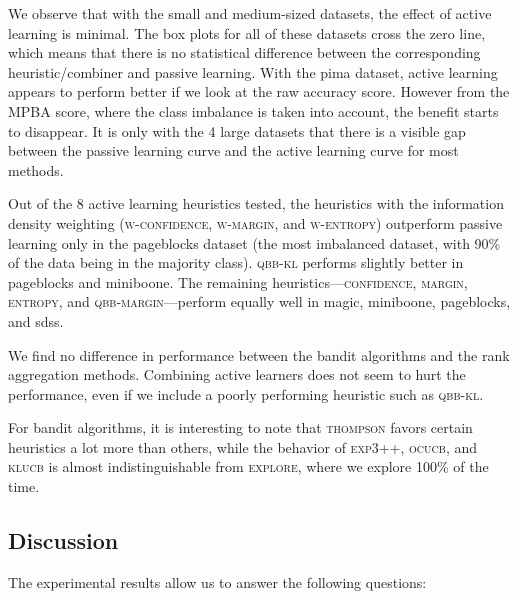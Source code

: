 \documentclass[fleqn,10pt,lineno]{wlpeerj} %
\begin{document}
We observe that with the small and medium-sized datasets, the effect of active
learning is minimal. The box plots for all of these datasets cross the zero
line, which means that there is no statistical difference between the
corresponding heuristic/combiner and passive learning. With the pima dataset,
active learning appears to perform better if we look at the raw accuracy score.
However from the MPBA score, where the class imbalance is taken into account,
the benefit starts to disappear. It is only with the 4 large datasets that
there is a visible gap between the passive learning curve and the active
learning curve for most methods.

Out of the 8 active learning heuristics tested, the heuristics with the
information density weighting (\textsc{w-confidence},
\textsc{w-margin}, and \textsc{w-entropy}) outperform passive learning only in
the pageblocks dataset (the most imbalanced dataset, with 90\% of the data
being in the majority class). \textsc{qbb-kl} performs slightly better in
pageblocks and miniboone. The remaining heuristics---\textsc{confidence},
\textsc{margin}, \textsc{entropy}, and \textsc{qbb-margin}---perform equally
well in magic, miniboone, pageblocks, and sdss.

We find no difference in performance between the bandit algorithms and
the rank aggregation methods. Combining active learners does not seem
to hurt the performance, even if we include a poorly performing heuristic
such as \textsc{qbb-kl}.

For bandit algorithms, it is interesting to note that \textsc{thompson}
favors certain heuristics a lot more than others, while the behavior of
\textsc{exp3++}, \textsc{ocucb}, and \textsc{klucb} is almost indistinguishable
from \textsc{explore}, where we explore 100\% of the time.

\subsection{Discussion}

The experimental results allow us to answer the following questions:
\end{document}

